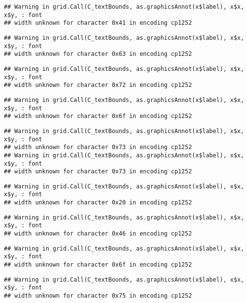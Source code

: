 \documentclass[
]{article}
\begin{document}
\begin{verbatim}
## Warning in grid.Call(C_textBounds, as.graphicsAnnot(x$label), x$x, x$y, : font
## width unknown for character 0x41 in encoding cp1252
\end{verbatim}

\begin{verbatim}
## Warning in grid.Call(C_textBounds, as.graphicsAnnot(x$label), x$x, x$y, : font
## width unknown for character 0x63 in encoding cp1252
\end{verbatim}

\begin{verbatim}
## Warning in grid.Call(C_textBounds, as.graphicsAnnot(x$label), x$x, x$y, : font
## width unknown for character 0x72 in encoding cp1252
\end{verbatim}

\begin{verbatim}
## Warning in grid.Call(C_textBounds, as.graphicsAnnot(x$label), x$x, x$y, : font
## width unknown for character 0x6f in encoding cp1252
\end{verbatim}

\begin{verbatim}
## Warning in grid.Call(C_textBounds, as.graphicsAnnot(x$label), x$x, x$y, : font
## width unknown for character 0x73 in encoding cp1252
## Warning in grid.Call(C_textBounds, as.graphicsAnnot(x$label), x$x, x$y, : font
## width unknown for character 0x73 in encoding cp1252
\end{verbatim}

\begin{verbatim}
## Warning in grid.Call(C_textBounds, as.graphicsAnnot(x$label), x$x, x$y, : font
## width unknown for character 0x20 in encoding cp1252
\end{verbatim}

\begin{verbatim}
## Warning in grid.Call(C_textBounds, as.graphicsAnnot(x$label), x$x, x$y, : font
## width unknown for character 0x46 in encoding cp1252
\end{verbatim}

\begin{verbatim}
## Warning in grid.Call(C_textBounds, as.graphicsAnnot(x$label), x$x, x$y, : font
## width unknown for character 0x6f in encoding cp1252
\end{verbatim}

\begin{verbatim}
## Warning in grid.Call(C_textBounds, as.graphicsAnnot(x$label), x$x, x$y, : font
## width unknown for character 0x75 in encoding cp1252
\end{verbatim}
\end{document}
